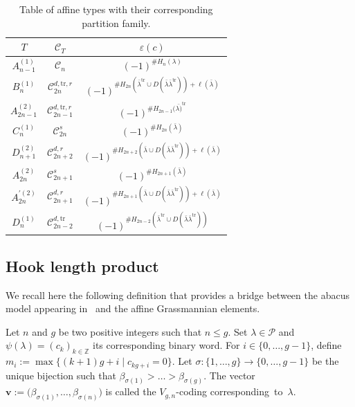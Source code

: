 \documentclass[pdftex]{sigma}
\numberwithin{equation}{section}
\newcommand{\cC}{\mathcal{C}}
\def\ccp{\mathcal P}
\newcommand{\Z}{\mathbb{Z}}
\begin{document}
\begin{table}[th]\centering\renewcommand{\arraystretch}{1.32}
\caption{Table of affine types with their corresponding partition family.}\label{tableau}
\begin{tabular}{|c|c|c|}
\hline
$T$ & $\cC_T$ & $\varepsilon(c)$ \\
\hline
\rule{0pt}{15pt} $A^{(1)}_{n-1}$ & $\cC_n$ &$(-1)^{\#H_n(\lambda)}$\\
\hline
\rule{0pt}{15pt} $B^{(1)}_{n}$& $\mathcal{C}%
_{2n}^{d,\mathrm{tr},r}$ &$(-1)^{\#H_{2n}(\bar{\lambda}^{\mathrm{tr}}\cup D(\bar{\lambda}\bar{\lambda}^\mathrm{tr}))+\ell(\bar{\lambda})}$ \\
\hline
\rule{0pt}{15pt}$A^{(2)}_{2n-1}$ & $\cC_{2n-1}^{d,\mathrm{tr},r}$ &$(-1)^{\#H_{2n-1}(\bar{\lambda)}^{\mathrm{tr}}}$\\
\hline
\rule{0pt}{15pt}$C^{(1)}_{n}$& $\mathcal{C}_{2n}^{s}$ & $(-1)^{\#H_{2n}(\bar{\lambda})}$\\
\hline
\rule{0pt}{15pt}$D^{(2)}_{n+1}$& $\cC_{2n+2}^{d,r}$ &$(-1)^{\#H_{2n+2}(\bar{\lambda}\cup D(\bar{\lambda}\bar{\lambda}^\mathrm{tr}))+\ell(\bar{\lambda})}$\\
\hline
\rule{0pt}{15pt}$A^{(2)}_{2n}$& $\cC_{2n+1}^s$ &$(-1)^{\#H_{2n+1}(\bar{\lambda})}$\\
\hline
\rule{0pt}{15pt}$A^{\prime (2)}_{2n}$& $\cC_{2n+1}^{d,r}$ &$(-1)^{\#H_{2n+1}(\bar{\lambda}\cup D(\bar{\lambda}\bar{\lambda}^\mathrm{tr}))+\ell(\bar{\lambda})}$ \\
\hline

\rule{0pt}{15pt}$D^{(1)}_{n}$& $\mathcal{C}_{2n-2}^{d,\mathrm{tr}}$ & $(-1)^{\#H_{2n-2}(\bar{\lambda}^{\mathrm{tr}}\cup D(\bar{\lambda}\bar{\lambda}^\mathrm{tr}))}$\\
\hline
\end{tabular}
\end{table}


\subsection{Hook length product}

We recall here the following definition that provides a bridge between the abacus model appearing in~\cite{Wmac} and the affine Grassmannian elements.

\begin{Definition}%
Let $n$ and $g$ be two positive integers such that $n\leq g$. Set $\lambda \in \ccp$ and $\psi(\lambda)=(c_k)_{k\in\Z}$ its corresponding binary word. For $i\in\lbrace 0,\dots,g-1\rbrace$, define $m_i:=\max\lbrace ({k+1})g+i\mid c_{kg+i}=0\rbrace$. Let $\sigma\colon\lbrace 1,\dots,g\rbrace\rightarrow \lbrace 0,\dots,g-1\rbrace$ be the unique bijection such that $\beta_{\sigma(1)}>\dots>\beta_{\sigma(g)}$. The vector $\mathbf{v}:=\bigl(\beta_{\sigma(1)},\dots,\beta_{\sigma(n)}\bigr)$ is called the $V_{g,n}$-coding corresponding~to~$\lambda$.
\end{Definition}
\end{document}
